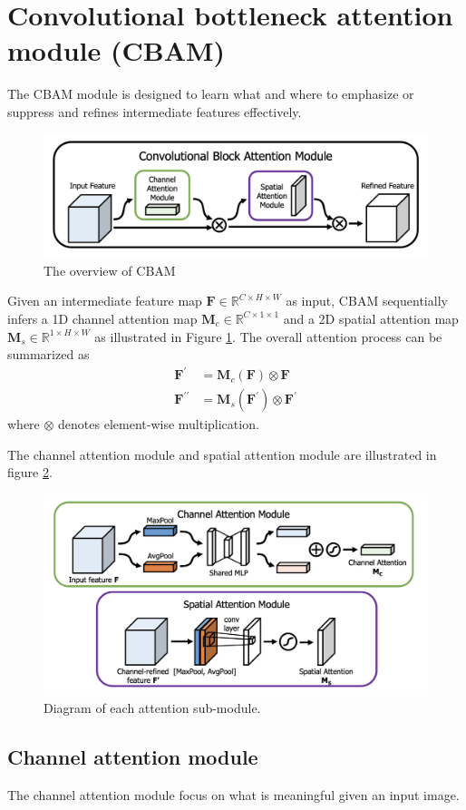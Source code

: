 \section{Convolutional bottleneck attention module (CBAM)}
The CBAM\cite{CBAM} module is designed to learn what and where to emphasize or suppress and refines intermediate features effectively.
\begin{figure}[h!]
	\centering
	\includegraphics[width=\linewidth]{img/cbam}
	\caption{The overview of CBAM \cite{CBAM}}
	\label{fig:cbam}
\end{figure}

Given an intermediate feature map $ \textbf{F} \in \mathbb{R}^{C\times H \times W} $ as input, CBAM sequentially infers a 1D channel attention map $ \textbf{M}_c \in \mathbb{R}^{C\times 1 \times 1} $ and a 2D spatial attention map $ \textbf{M}_s \in \mathbb{R}^{1\times H \times W} $ as illustrated in Figure \ref{fig:cbam}. The overall attention process can be summarized as 
\begin{equation}
	\begin{split}
		\textbf{F}^\prime &= \textbf{M}_c (\textbf{F}) \otimes \textbf{F}\\
		\textbf{F}^{\prime \prime} &= \textbf{M}_s(\textbf{F}^\prime)\otimes \textbf{F}^\prime
	\end{split}
\end{equation} 
where $ \otimes $ denotes element-wise multiplication.

The channel attention module and spatial attention module are illustrated in figure \ref{fig:cbam-attention}. 
\begin{figure}[h!]
	\centering
	\includegraphics[width=\linewidth]{img/cbam-attention}
	\caption{Diagram of each attention sub-module.\cite{CBAM}}
	\label{fig:cbam-attention}
\end{figure}

\subsection{Channel attention module}
The channel attention module focus on what is meaningful given an input image. 









